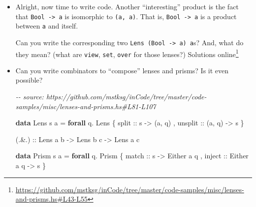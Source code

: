 \documentclass[]{article}
\newenvironment{Shaded}{}{}
\newcommand{\CommentTok}[1]{\textcolor[rgb]{0.38,0.63,0.69}{\textit{#1}}}
\newcommand{\DataTypeTok}[1]{\textcolor[rgb]{0.56,0.13,0.00}{#1}}
\newcommand{\KeywordTok}[1]{\textcolor[rgb]{0.00,0.44,0.13}{\textbf{#1}}}
\newcommand{\NormalTok}[1]{#1}
\newcommand{\OperatorTok}[1]{\textcolor[rgb]{0.40,0.40,0.40}{#1}}
\newcommand{\OtherTok}[1]{\textcolor[rgb]{0.00,0.44,0.13}{#1}}
\renewcommand{\href}[2]{#2\footnote{\url{#1}}}
\begin{document}
\begin{itemize}
\begin{Shaded}
\begin{Highlighting}[]
\OtherTok{mysteryPrism1 ::} \DataTypeTok{Prism\textquotesingle{}}\NormalTok{ (}\DataTypeTok{Bool}\NormalTok{, a) a}

\OtherTok{mysteryPrism2 ::} \DataTypeTok{Prism\textquotesingle{}}\NormalTok{ (}\DataTypeTok{Bool}\NormalTok{, a) a}
\end{Highlighting}
\end{Shaded}

  What do these prisms do? What is \texttt{preview}, \texttt{review},
  \texttt{over} for them?
\item
  Alright, now time to write code. Another ``interesting'' product is the fact
  that \texttt{Bool\ -\textgreater{}\ a} is isomorphic to \texttt{(a,\ a)}. That
  is, \texttt{Bool\ -\textgreater{}\ a} is a product between \texttt{a} and
  itself.

  Can you write the corresponding two
  \texttt{Lens\textquotesingle{}\ (Bool\ -\textgreater{}\ a)\ a}s? And, what do
  they mean? (what are \texttt{view}, \texttt{set}, \texttt{over} for those
  lenses?)
  \href{https://github.com/mstksg/inCode/tree/master/code-samples/misc/lenses-and-prisms.hs\#L43-L55}{Solutions
  online}
\item
  Can you write combinators to ``compose'' lenses and prisms? Is it even
  possible?

\begin{Shaded}
\begin{Highlighting}[]
\CommentTok{{-}{-} source: https://github.com/mstksg/inCode/tree/master/code{-}samples/misc/lenses{-}and{-}prisms.hs\#L81{-}L107}

\KeywordTok{data} \DataTypeTok{Lens\textquotesingle{}}\NormalTok{ s a }\OtherTok{=} \KeywordTok{forall}\NormalTok{ q}\OperatorTok{.} \DataTypeTok{Lens\textquotesingle{}}
\NormalTok{    \{}\OtherTok{ split   ::}\NormalTok{ s }\OtherTok{{-}\textgreater{}}\NormalTok{ (a, q)}
\NormalTok{    ,}\OtherTok{ unsplit ::}\NormalTok{ (a, q) }\OtherTok{{-}\textgreater{}}\NormalTok{ s}
\NormalTok{    \}}

\OtherTok{(.\&.) ::} \DataTypeTok{Lens\textquotesingle{}}\NormalTok{ a b}
      \OtherTok{{-}\textgreater{}} \DataTypeTok{Lens\textquotesingle{}}\NormalTok{ b c}
      \OtherTok{{-}\textgreater{}} \DataTypeTok{Lens\textquotesingle{}}\NormalTok{ a c}

\KeywordTok{data} \DataTypeTok{Prism\textquotesingle{}}\NormalTok{ s a }\OtherTok{=} \KeywordTok{forall}\NormalTok{ q}\OperatorTok{.} \DataTypeTok{Prism\textquotesingle{}}
\NormalTok{    \{}\OtherTok{ match  ::}\NormalTok{ s }\OtherTok{{-}\textgreater{}} \DataTypeTok{Either}\NormalTok{ a q}
\NormalTok{    ,}\OtherTok{ inject ::} \DataTypeTok{Either}\NormalTok{ a q }\OtherTok{{-}\textgreater{}}\NormalTok{ s}
\NormalTok{    \}}


\end{Highlighting}
\end{Shaded}
\end{itemize}
\end{document}
